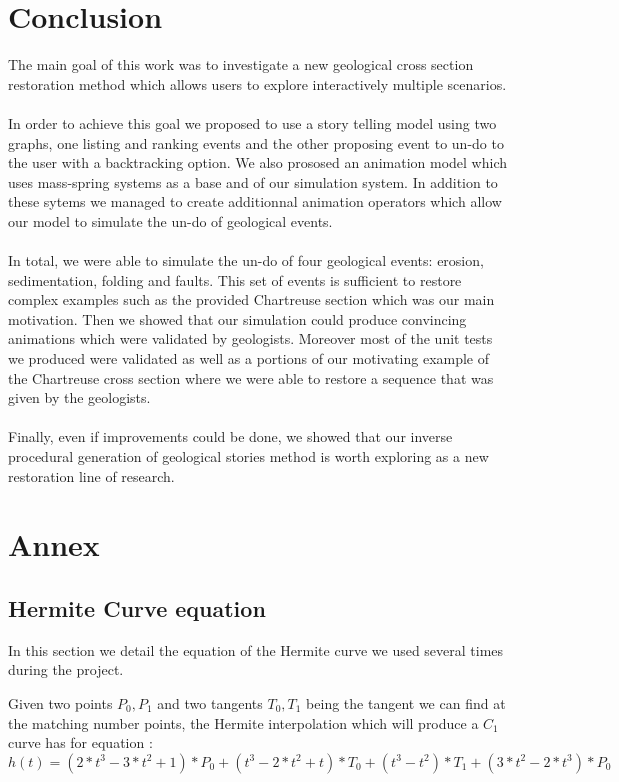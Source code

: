 \documentclass[12pt, a4paper]{report} %
\begin{document}
\chapter{Conclusion}
The main goal of this work was to investigate a new geological cross section restoration method which allows users to explore interactively multiple scenarios. \\\\
In order to achieve this goal we proposed to use a story telling model using two graphs, one listing and ranking events and the other proposing event to un-do to the user with a backtracking option. We  also prososed an animation model which uses mass-spring systems as a base and of our simulation system. In addition to these sytems we managed to create additionnal animation operators which allow our model to simulate the un-do of geological events.\\\\ In total, we were able to simulate the un-do of four geological events: erosion, sedimentation, folding and faults. This set of events is sufficient to restore complex examples such as the provided Chartreuse section which was our main motivation.
 Then we showed that our simulation could produce convincing animations which were validated by geologists. Moreover most of the unit tests we produced were validated as well as a portions of our motivating example of the Chartreuse cross section where we were able to restore a sequence that was given by the geologists.\\\\
 Finally, even if improvements could be done, we showed that our inverse procedural generation of geological stories method is worth exploring as a new restoration line of research.




\chapter{Annex}

\section{Hermite Curve equation}
In this section we detail the equation of the Hermite curve we used several times during the project.

Given two points $P_0, P_1$ and two tangents $T_0, T_1$ being the tangent we can find at the matching number points, the Hermite interpolation which will produce a $C_1$ curve has for equation : 
\begin{equation}
h(t) = (2*t^3 - 3*t^2 + 1)*P_0 + (t^3 - 2*t^2 + t)*T_0 + (t^3 -t^2)*T_1 +(3*t^2 - 2*t^3)*P_0
\end{equation}
\end{document}
